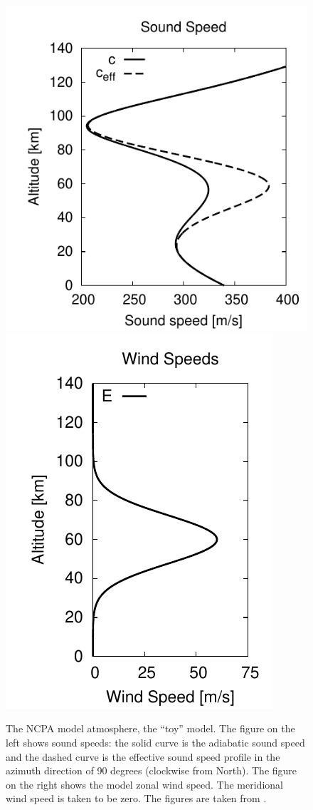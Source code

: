\begin{figure}
\begin{center}
\includegraphics[scale=0.62]{figs/model_atmos_c}
\includegraphics[scale=0.62]{figs/model_atmos_winds_u}
\end{center}
\caption{The NCPA model atmosphere, the ``toy'' model. The figure on the left shows sound speeds: the solid curve is the adiabatic sound speed and the dashed curve is the effective sound speed profile in the azimuth direction of 90 degrees (clockwise from North). The figure on the right shows the model zonal wind speed. The meridional wind speed is taken to be zero. The figures are taken from \cite{waxler2015stratospheric}.}
\label{fig:canonic_sound_speeds}
\end{figure}

